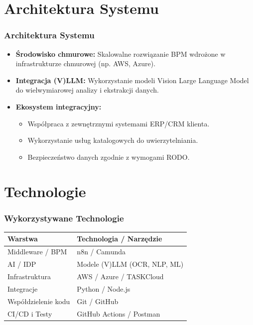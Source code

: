 \documentclass[11pt]{beamer}
\begin{document}
\section{Architektura Systemu}

\begin{frame}
    \frametitle{Architektura Systemu}
    \begin{itemize}
        \item \textbf{Środowisko chmurowe:} Skalowalne rozwiązanie BPM wdrożone w infrastrukturze chmurowej (np. AWS, Azure).
        \item \textbf{Integracja (V)LLM:} Wykorzystanie modeli Vision Large Language Model do wielwymiarowej analizy i ekstrakcji danych.
        \item \textbf{Ekosystem integracyjny:} 
        \begin{itemize}
            \item Współpraca z zewnętrznymi systemami ERP/CRM klienta.
            \item Wykorzystanie usług katalogowych do uwierzytelniania.
            \item Bezpieczeństwo danych zgodnie z wymogami RODO.
        \end{itemize}
    \end{itemize}
\end{frame}

\section{Technologie}

\begin{frame}
    \frametitle{Wykorzystywane Technologie}
    \begin{table}
        \begin{tabular}{l l}
            \toprule
            \textbf{Warstwa} & \textbf{Technologia / Narzędzie} \\
            \midrule
            Middleware / BPM & n8n / Camunda \\
            AI / IDP & Modele (V)LLM (OCR, NLP, ML)  \\
            Infrastruktura & AWS / Azure / TASKCloud  \\
            Integracje & Python / Node.js \\
            Współdzielenie kodu & Git / GitHub  \\
            CI/CD i Testy & GitHub Actions / Postman  \\
            \bottomrule
        \end{tabular}
    \end{table}
\end{frame}
\end{document}
